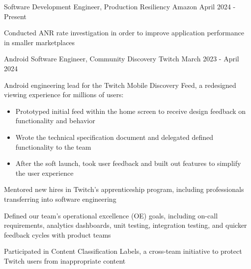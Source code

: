 

\begin{cventries}

  \cventry
    {Software Development Engineer, Production Resiliency} %
    {Amazon} %
    {} %
    {April 2024 - Present} %
    {
    \begin{cvitems} %
    \item { Conducted ANR rate investigation in order to improve application performance in smaller marketplaces }
    \end{cvitems}
    }

  \cventry
    {Android Software Engineer, Community Discovery} %
    {Twitch} %
    {} %
    {March 2023 - April 2024} %
    {
    \begin{cvitems} %
    \item { Android engineering lead for the Twitch Mobile Discovery Feed, a redesigned viewing experience for millions of users: 
        \begin{itemize}
            \item Prototyped initial feed within the home screen to receive design feedback on functionality and behavior
            \item Wrote the technical specification document and delegated defined functionality to the team
            \item After the soft launch, took user feedback and built out features to simplify the user experience
        \end{itemize}}
    \item Mentored new hires in Twitch's apprenticeship program, including professionals transferring into software engineering
    \item Defined our team's operational excellence (OE) goals, including on-call requirements, analytics dashboards, unit testing, integration testing, and quicker feedback cycles with product teams
    \item Participated in Content Classification Labels, a cross-team initiative to protect Twitch users from inappropriate content
    \end{cvitems}
    }


\end{cventries}
